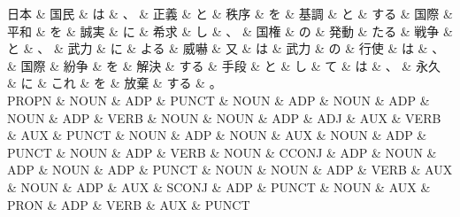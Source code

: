 \documentclass[tikz,border=5pt]{standalone}
\begin{document}
\small
\begin{dependency}[edge unit distance=6.9pt]
    \begin{deptext}[column sep=0.5em]
        日本 \& 国民 \& は \& 、 \& 正義 \& と \& 秩序 \& を \& 基調 \& と \& する \& 国際 \& 平和 \& を \& 誠実 \& に \& 希求 \& し \& 、 \& 国権 \& の \& 発動 \& たる \& 戦争 \& と \& 、 \& 武力 \& に \& よる \& 威嚇 \& 又 \& は \& 武力 \& の \& 行使 \& は \& 、 \& 国際 \& 紛争 \& を \& 解決 \& する \& 手段 \& と \& し \& て \& は \& 、 \& 永久 \& に \& これ \& を \& 放棄 \& する \& 。\\
        PROPN \& NOUN \& ADP \& PUNCT \& NOUN \& ADP \& NOUN \& ADP \& NOUN \& ADP \& VERB \& NOUN \& NOUN \& ADP \& ADJ \& AUX \& VERB \& AUX \& PUNCT \& NOUN \& ADP \& NOUN \& AUX \& NOUN \& ADP \& PUNCT \& NOUN \& ADP \& VERB \& NOUN \& CCONJ \& ADP \& NOUN \& ADP \& NOUN \& ADP \& PUNCT \& NOUN \& NOUN \& ADP \& VERB \& AUX \& NOUN \& ADP \& AUX \& SCONJ \& ADP \& PUNCT \& NOUN \& AUX \& PRON \& ADP \& VERB \& AUX \& PUNCT\\
    \end{deptext}
\end{dependency}
\end{document}
